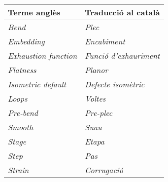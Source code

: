 \begin{center}
    \begin{tabular}{ll}
    \hline
    \textbf{Terme anglès} & \textbf{Traducció al català} \\
    \hline
    \textit{Bend} & \textit{Plec} \\
    \textit{Embedding} & \textit{Encabiment} \\
    \textit{Exhaustion function} & \textit{Funció d'exhauriment} \\
    \textit{Flatness} & \textit{Planor} \\
    \textit{Isometric default} & \textit{Defecte isomètric} \\
    \textit{Loops} & \textit{Voltes} \\
    \textit{Pre-bend} & \textit{Pre-plec} \\
    \textit{Smooth} & \textit{Suau} \\
    \textit{Stage} & \textit{Etapa} \\
    \textit{Step} & \textit{Pas} \\
    \textit{Strain} & \textit{Corrugació} \\
    \hline
    \end{tabular}
\end{center}
\newpage
{}
\setcounter{page}{1}
